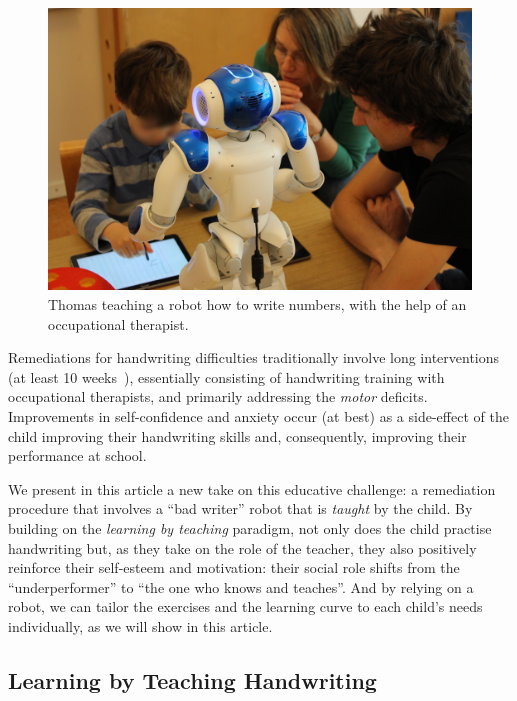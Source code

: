 \documentclass{article}
\begin{document}
\begin{figure}
    \centering
    \includegraphics[width=0.9\linewidth]{henry}
    \caption{\small Thomas teaching a  robot how to write numbers, with 
    the help of an occupational therapist.}
    \label{fig:henry}
\end{figure}

Remediations for handwriting difficulties traditionally involve long
interventions (at least 10 weeks~\cite{Hoy2011}), essentially consisting of
handwriting training with occupational therapists, and primarily addressing the
\emph{motor} deficits.  Improvements in self-confidence and anxiety occur (at
best) as a side-effect of the child improving their handwriting skills and,
consequently, improving their performance at school.

We present in this article a new take on this educative challenge: a remediation
procedure that involves a ``bad writer'' robot that is \emph{taught} by the
child. By building on the \emph{learning by teaching} paradigm, not only does the
child practise handwriting but, as they take on the role of the teacher, they
also positively reinforce their self-esteem and motivation: their social role
shifts from the ``underperformer'' to ``the one who knows and teaches''. And by
relying on a robot, we can tailor the exercises and the learning curve to each
child's needs individually, as we will show in this article.

\subsection{Learning by Teaching Handwriting}
\end{document}
